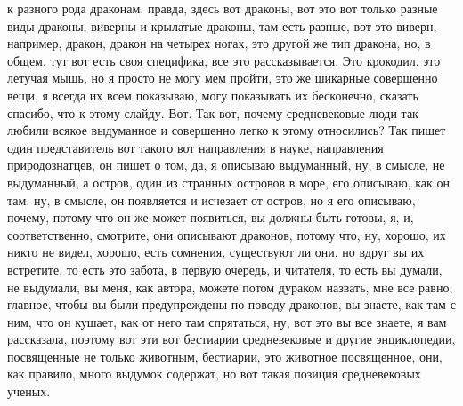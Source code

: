 к разного рода драконам, правда, здесь вот драконы, вот это вот только разные
виды драконы, виверны и крылатые драконы, там есть разные, вот это виверн,
например, дракон, дракон на четырех ногах, это другой же тип дракона, но, в
общем, тут вот есть своя специфика, все это рассказывается. Это крокодил, это
летучая мышь, но я просто не могу мем пройти, это же шикарные совершенно вещи, я
всегда их всем показываю, могу показывать их бесконечно, сказать спасибо, что к
этому слайду. Вот. Так вот, почему средневековые люди так любили всякое
выдуманное и совершенно легко к этому относились? Так пишет один представитель
вот такого вот направления в науке, направления природознатцев, он пишет о том,
да, я описываю выдуманный, ну, в смысле, не выдуманный, а остров, один из
странных островов в море, его описываю, как он там, ну, в смысле, он появляется
и исчезает от остров, но я его описываю, почему, потому что он же может
появиться, вы должны быть готовы, я, и, соответственно, смотрите, они описывают
драконов, потому что, ну, хорошо, их никто не видел, хорошо, есть сомнения,
существуют ли они, но вдруг вы их встретите, то есть это забота, в первую
очередь, и читателя, то есть вы думали, не выдумали, вы меня, как автора, можете
потом дураком назвать, мне все равно, главное, чтобы вы были предупреждены по
поводу драконов, вы знаете, как там с ним, что он кушает, как от него там
спрятаться, ну, вот это вы все знаете, я вам рассказала, поэтому вот эти вот
бестиарии средневековые и другие энциклопедии, посвященные не только животным,
бестиарии, это животное посвященное, они, как правило, много выдумок содержат,
но вот такая позиция средневековых ученых.